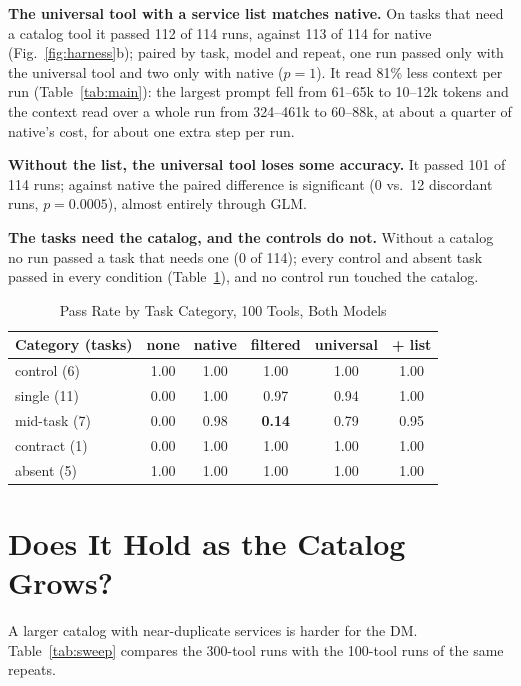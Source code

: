 \documentclass[conference]{IEEEtran}
\begin{document}
\textbf{The universal tool with a service list matches native.} On tasks that need a catalog tool it passed
112 of 114 runs, against 113 of 114 for native (Fig.~\ref{fig:harness}b); paired by task, model and repeat, one
run passed only with the universal tool and two only with native ($p=1$). It read 81\% less context per run
(Table~\ref{tab:main}): the largest prompt fell from 61--65k to 10--12k tokens and the context read over a whole
run from 324--461k to 60--88k, at about a quarter of native's cost, for about one extra step per run.

\textbf{Without the list, the universal tool loses some accuracy.} It passed 101 of 114 runs; against native
the paired difference is significant (0 vs.\ 12 discordant runs, $p=0.0005$), almost entirely through GLM.

\textbf{The tasks need the catalog, and the controls do not.} Without a catalog no run passed a task that needs
one (0 of 114); every control and absent task passed in every condition (Table~\ref{tab:cats}), and no control
run touched the catalog.

\begin{table}[t]
\caption{Pass Rate by Task Category, 100 Tools, Both Models}
\label{tab:cats}
\centering\footnotesize
\setlength{\tabcolsep}{4pt}
\begin{tabular}{@{}lccccc@{}}
\toprule
Category (tasks) & none & native & filtered & universal & + list \\
\midrule
control (6) & 1.00 & 1.00 & 1.00 & 1.00 & 1.00 \\
single (11) & 0.00 & 1.00 & 0.97 & 0.94 & 1.00 \\
mid-task (7) & 0.00 & 0.98 & \textbf{0.14} & 0.79 & 0.95 \\
contract (1) & 0.00 & 1.00 & 1.00 & 1.00 & 1.00 \\
absent (5) & 1.00 & 1.00 & 1.00 & 1.00 & 1.00 \\
\bottomrule
\end{tabular}
\end{table}

\section{Does It Hold as the Catalog Grows?}\label{sec:scale}
A larger catalog with near-duplicate services is harder for the DM. Table~\ref{tab:sweep} compares the 300-tool runs with the 100-tool runs of the same
repeats.
\end{document}
